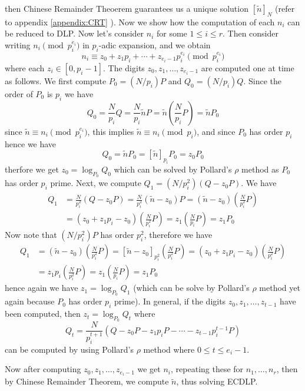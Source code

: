 \documentclass[a4 paper]{article}
\newcommand{\?}{\stackrel{?}{=}}
\begin{document}
then Chinese Remainder Theoerem guarantees us a unique solution $ [\tilde{n}]_N $ (refer to appendix \ref{appendix:CRT} ). Now we show how the computation of each $ n_i $ can be reduced to DLP. Now let's consider $ n_i $ for some $ 1 \leq i \leq r $. Then consider writing $ n_i \pmod {p_i^{e_i}} $ in $ p_i  $-adic expansion, and we obtain 
$$ n_i \equiv z_0 + z_1 p_i +\cdots + z_{e_i -1} p_i^{e_i} \pmod {p_i^{e_i}}$$
where each $ z_i \in [0, p_i-1] $. The digits $ z_0 , z_1 ,\dots, z_{e_i -1} $ are computed one at time as follows. We first compute $ P_0 = (N / p_i )P  $ and $ Q_0 = (N / p_i )Q $. Since the order of $ P_0  $ is $ p_i $ we have 
$$ Q_0 = \frac{N}{p_i} Q = \frac{N}{p_i}\tilde{n} P = \tilde{n} \left(\frac{N}{p_i}P\right) = \tilde{n} P_0  $$
since $ \tilde{n} \equiv n_i \pmod {p_i^{e_i }} $, this implies $ \tilde{n } \equiv n_i \pmod {p_i}$, and since $ P_0  $ has order $ p_i $ hence we have
$$ Q_0 = \tilde{n}P_0 = [\tilde{n}]_{p_i} P_0 = z_0 P_0  $$
therfore we get $ z_0 = \log_{P_0 }Q_0  $ which can be solved by Pollard's $ \rho $ method as $ P_0  $ has order $ p_i $ prime. Next, we compute $ Q_1 = (N / p_i^2) (Q -z_0 P) $. We have 
\begin{align*}
    Q_1 & = \frac{N}{p_i^2} (Q - z_0 P) = \frac{N}{p_i^2} (\tilde{n} - z_0 ) P = (\tilde{n} -z_0 ) \left(\frac{N}{p_i^2} P\right) \\ 
        & = (z_0 + z_1 p_i - z_0 ) \left(\frac{N}{p_i^2}P\right) = z_1 \left(\frac{N}{p_i}P\right) = z_1 P_0 
\end{align*}
Now note that  $ (N / p_i^2) P  $ has order $ p_i^2 $, therefore we have 
\begin{align*}
    Q_1 &= ( \tilde{n} - z_0 ) \left(\frac{N}{p_i^2} P\right) = [\tilde{n} -z_0 ]_{p_i^2} \left(\frac{N}{p_i^2}P\right)  = (z_0 + z_1 p_i -z_0 )\left(\frac{N}{p_i^2}P\right)    \\ 
        & = z_1 p_i \left(\frac{N}{p_i^2}P\right) = z_1 \left(\frac{N}{p_i}P\right) = z_1 P_0 
\end{align*}
hence again we have $ z_1 = \log_{P_0} Q_1  $ (which can be solve by Pollard's $ \rho $ method yet again because $ P_0  $ has order $ p_i  $ prime). In general, if the digits $ z_0 ,z_1 , \dots, z_{t-1} $ have been computed, then $ z_t = \log_{P_0 }Q_t $ where 
$$ Q_t = \frac{N}{p_i^{t+1}}\left(Q - z_0 P -z_1 p_i P - \cdots - z_{t-1}p_i^{t-1}P\right) $$
can be computed by using Pollard's $ \rho $ method where $ 0 \leq t \leq e_i - 1 $.
 
Now after computing $ z_0 , z_1 , \dots, z_{e_i -1 } $ we get $ n_i $, repeating these for $ n_1 ,\dots, n_r $, then by Chinese Remainder Theorem, we compute $ \tilde{n} $, thus solving ECDLP. 
\end{document}
